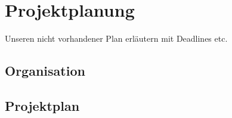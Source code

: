 \chapter{Projektplanung}
	
	Unseren nicht vorhandener Plan erläutern mit Deadlines etc.
	\section{Organisation}
	\section{Projektplan}
	